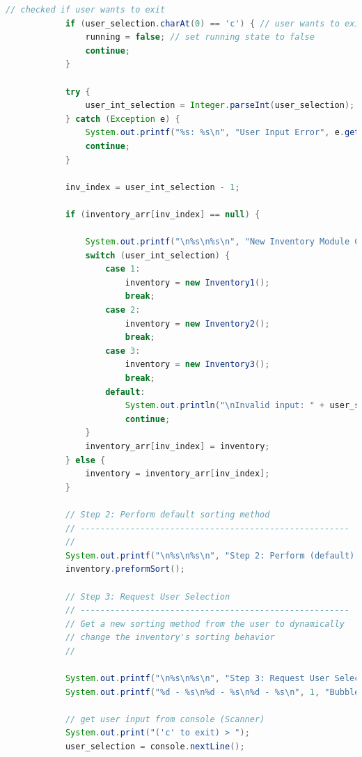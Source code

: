 \documentclass[12pt]{article}
\begin{document}
\begin{lstlisting}[language=Java]
            // checked if user wants to exit
            if (user_selection.charAt(0) == 'c') { // user wants to exit
                running = false; // set running state to false
                continue;
            }

            try {
                user_int_selection = Integer.parseInt(user_selection);
            } catch (Exception e) {
                System.out.printf("%s: %s\n", "User Input Error", e.getMessage());
                continue;
            }

            inv_index = user_int_selection - 1;

            if (inventory_arr[inv_index] == null) {

                System.out.printf("\n%s\n%s\n", "New Inventory Module Created", dv);
                switch (user_int_selection) {
                    case 1:
                        inventory = new Inventory1();
                        break;
                    case 2:
                        inventory = new Inventory2();
                        break;
                    case 3:
                        inventory = new Inventory3();
                        break;
                    default:
                        System.out.println("\nInvalid input: " + user_selection);
                        continue;
                }
                inventory_arr[inv_index] = inventory;
            } else {
                inventory = inventory_arr[inv_index];
            }

            // Step 2: Perform default sorting method
            // ------------------------------------------------------
            //
            System.out.printf("\n%s\n%s\n", "Step 2: Perform (default) Sorting Method", dv);
            inventory.preformSort();

            // Step 3: Request User Selection
            // ------------------------------------------------------
            // Get a new sorting method from the user to dynamically
            // change the inventory's sorting behavior
            //
            
            System.out.printf("\n%s\n%s\n", "Step 3: Request User Selection (Sorting Method)", dv);
            System.out.printf("%d - %s\n%d - %s\n%d - %s\n", 1, "BubbleSort", 2, "MergeSort", 3, "QuickSort");

            // get user input from console (Scanner)
            System.out.print("('c' to exit) > ");
            user_selection = console.nextLine();


\end{lstlisting}
\end{document}
